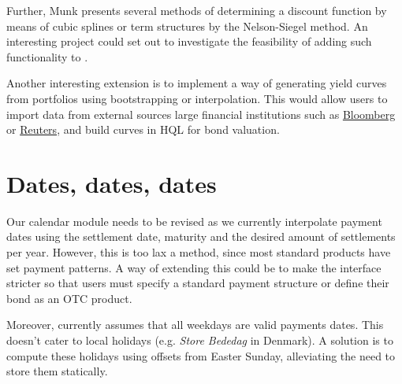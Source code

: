 Further, Munk\cite{cmunk} presents several methods of determining a discount
function by means of cubic splines or term structures by the Nelson-Siegel method. 
An interesting project could set out to investigate the feasibility of adding such 
functionality to \hql.

Another interesting extension is to implement a way of generating yield curves 
from portfolios using bootstrapping or interpolation\cite{cmunk}.
This would allow users to import data from external sources large financial
institutions such as \href{www.bloomberg.com}{Bloomberg} or
\href{www.reuters.com}{Reuters}, and build curves in HQL for bond valuation.\\

\section{Dates, dates, dates}

Our calendar module needs to be revised as we currently interpolate 
payment dates using the settlement date, maturity and the desired amount of 
settlements per year. However, this is too lax a method, since most standard 
products have set payment patterns. A way of extending this could be to make
the interface stricter so that users must specify a standard payment 
structure or define their bond as an OTC product.

Moreover, \hql currently assumes that all weekdays are valid payments dates. 
This doesn't cater to local holidays (e.g. \emph{Store Bededag} in Denmark). A 
solution is to compute these holidays using offsets from Easter Sunday, 
alleviating the need to store them statically.\\

